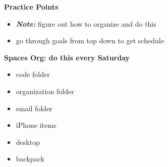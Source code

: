 \textbf{Practice Points}\\
\begin{itemize}
\item \textit{\textbf{Note:}} figure out how to organize and do this
\item go through goals from top down to get schedule
\end{itemize}

\textbf{Spaces Org: do this every Saturday }
\begin{itemize}
\item code folder
\item organization folder
\item email folder
\item iPhone items
\item desktop
\item backpack
\end{itemize}

